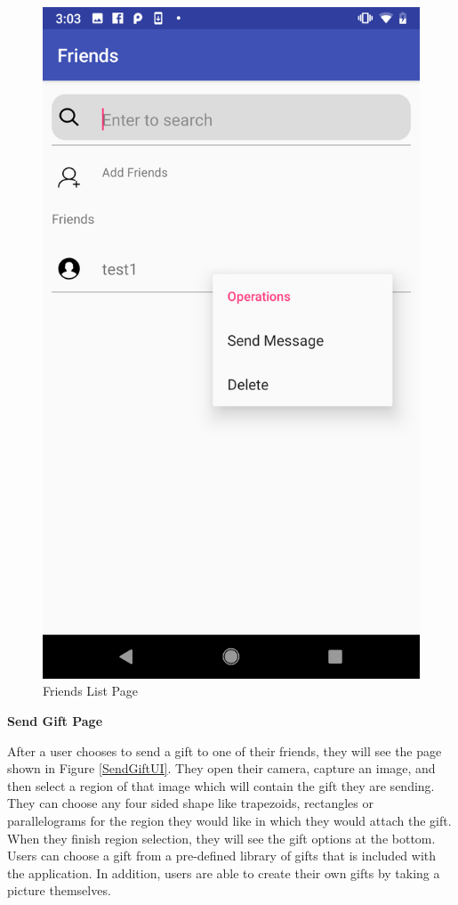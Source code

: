 \begin{figure}[H]
\begin{minipage}[t]{0.45\textwidth}
\includegraphics[width=.95\textwidth]{section03/assets/FriendsListAction.png}
\subcaption{\label{FriendsListActionUI}}
\end{minipage}%
\caption[Friends List Page]{\label{WholeFriendsListUI}Friends List Page}
\end{figure}

\textbf{Send Gift Page}

\par After a user chooses to send a gift to one of their friends, they will see the  page shown in Figure \ref{SendGiftUI}. They open their camera, capture an image, and then select a region of that image which will contain the gift they are sending.  They can choose any four sided shape like trapezoids, rectangles or parallelograms for the region they would like in which they would attach the gift. When they finish region selection, they will see the gift options at the bottom. Users can choose a gift from a pre-defined library of gifts that is included with the application.  In addition, users are able to create their own gifts by taking a picture themselves. 

